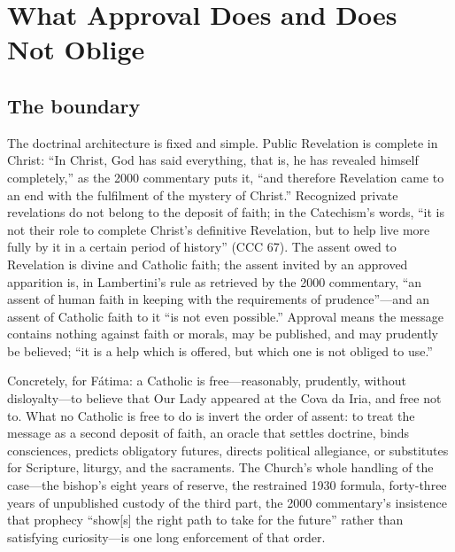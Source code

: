 \section{What Approval Does and Does Not Oblige}\label{sec:obliges}

\subsection{The  boundary}

The doctrinal architecture is fixed and simple. Public Revelation is
complete in Christ: ``In Christ, God has said everything, that is, he
has revealed himself completely,'' as the 2000 commentary puts it,
``and therefore Revelation came to an end with the fulfilment of the
mystery of Christ.'' Recognized private revelations do not belong to
the deposit of faith; in the Catechism's words, ``it is not their
role to complete Christ's definitive Revelation, but to help live
more fully by it in a certain period of history'' (CCC 67). The assent owed to Revelation is divine and Catholic
faith; the assent invited by an approved apparition is, in
Lambertini's rule as retrieved by the 2000 commentary, ``an assent of
human faith in keeping with the requirements of prudence''---and an
assent of Catholic faith to it ``is not even possible.'' Approval
means the message contains nothing against faith or morals, may be
published, and may prudently be believed; ``it is a help which is
offered, but which one is not obliged to use.''

Concretely, for F\'atima: a Catholic is free---reasonably,
prudently, without disloyalty---to believe that Our Lady appeared at
the Cova da Iria, and free not to. What no Catholic is free to do is
invert the order of assent: to treat the message as a second deposit
of faith, an oracle that settles doctrine, binds consciences,
predicts obligatory futures, directs political allegiance, or
substitutes for Scripture, liturgy, and the sacraments. The Church's
whole handling of the case---the bishop's eight years of reserve, the
restrained 1930 formula, forty-three years of unpublished custody of
the third part, the 2000 commentary's insistence that prophecy
``show[s] the right path to take for the future'' rather than
satisfying curiosity---is one long enforcement of that order.


